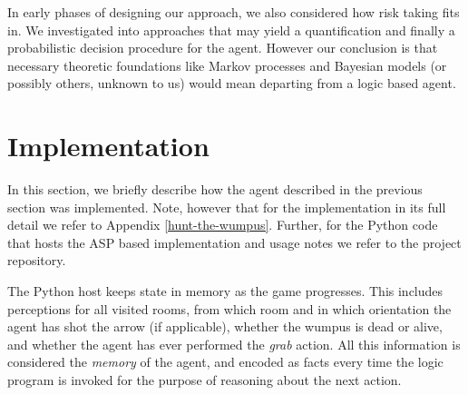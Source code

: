 \documentclass{llncs}
\begin{document}
In early phases of designing our approach, we also considered how risk taking fits in. We investigated into approaches that may yield a quantification and finally a probabilistic decision procedure for the agent. However our conclusion is that necessary theoretic foundations like Markov processes and Bayesian models (or possibly others, unknown to us) would mean departing from a logic based agent.


\section{Implementation}

In this section, we briefly describe how the agent described in the previous section was implemented. Note, however that for the implementation in its full detail we refer to Appendix \ref{hunt-the-wumpus}. Further, for the Python code that hosts the ASP based implementation and usage notes we refer to the project repository.

The Python host keeps state in memory as the game progresses. This includes perceptions for all visited rooms, from which room and in which orientation the agent has shot the arrow (if applicable), whether the wumpus is dead or alive, and whether the agent has ever performed the \emph{grab} action. All this information is considered the \emph{memory} of the agent, and encoded as facts every time the logic program is invoked for the purpose of reasoning about the next action.
\end{document}
